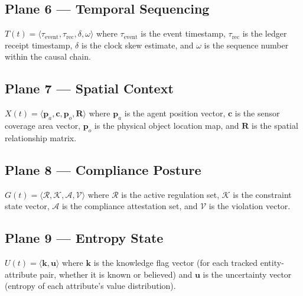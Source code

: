 \documentclass[12pt]{article}
\begin{document}
\subsection{Plane 6 --- Temporal Sequencing}
$T(t) = \langle \tau_{\text{event}}, \tau_{\text{rec}}, \delta, \omega \rangle$ where $\tau_{\text{event}}$ is the event timestamp, $\tau_{\text{rec}}$ is the ledger receipt timestamp, $\delta$ is the clock skew estimate, and $\omega$ is the sequence number within the causal chain.

\subsection{Plane 7 --- Spatial Context}
$X(t) = \langle \mathbf{p}_a, \mathbf{c}, \mathbf{p}_o, \mathbf{R} \rangle$ where $\mathbf{p}_a$ is the agent position vector, $\mathbf{c}$ is the sensor coverage area vector, $\mathbf{p}_o$ is the physical object location map, and $\mathbf{R}$ is the spatial relationship matrix.

\subsection{Plane 8 --- Compliance Posture}
$G(t) = \langle \mathcal{R}, \mathcal{K}, \mathcal{A}, \mathcal{V} \rangle$ where $\mathcal{R}$ is the active regulation set, $\mathcal{K}$ is the constraint state vector, $\mathcal{A}$ is the compliance attestation set, and $\mathcal{V}$ is the violation vector.

\subsection{Plane 9 --- Entropy State}
$U(t) = \langle \mathbf{k}, \mathbf{u} \rangle$ where $\mathbf{k}$ is the knowledge flag vector (for each tracked entity-attribute pair, whether it is known or believed) and $\mathbf{u}$ is the uncertainty vector (entropy of each attribute's value distribution).
\end{document}
